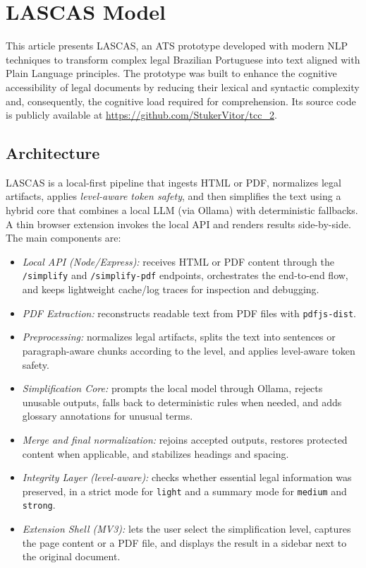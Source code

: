 \documentclass[english]{UNISINOSartigo} %
\begin{document}
\section{LASCAS Model}

This article presents LASCAS, an ATS prototype developed with modern NLP techniques to transform complex legal Brazilian Portuguese into text aligned with Plain Language principles. The prototype was built to enhance the cognitive accessibility of legal documents by reducing their lexical and syntactic complexity and, consequently, the cognitive load required for comprehension. Its source code is publicly available at \url{https://github.com/StukerVitor/tcc_2}.

\subsection{Architecture}

LASCAS is a local-first pipeline that ingests HTML or PDF, normalizes legal artifacts, applies \emph{level-aware token safety}, and then simplifies the text using a hybrid core that combines a local LLM (via Ollama) with deterministic fallbacks. A thin browser extension invokes the local API and renders results side-by-side. The main components are:

\begin{itemize}
\item \textit{Local API (Node/Express):} receives HTML or PDF content through the \texttt{/simplify} and \texttt{/simplify-pdf} endpoints, orchestrates the end-to-end flow, and keeps lightweight cache/log traces for inspection and debugging.
\item \textit{PDF Extraction:} reconstructs readable text from PDF files with \texttt{pdfjs-dist}.
\item \textit{Preprocessing:} normalizes legal artifacts, splits the text into sentences or paragraph-aware chunks according to the level, and applies level-aware token safety.
\item \textit{Simplification Core:} prompts the local model through Ollama, rejects unusable outputs, falls back to deterministic rules when needed, and adds glossary annotations for unusual terms.
\item \textit{Merge and final normalization:} rejoins accepted outputs, restores protected content when applicable, and stabilizes headings and spacing.
\item \textit{Integrity Layer (level-aware):} checks whether essential legal information was preserved, in a strict mode for \texttt{light} and a summary mode for \texttt{medium} and \texttt{strong}.
\item \textit{Extension Shell (MV3):} lets the user select the simplification level, captures the page content or a PDF file, and displays the result in a sidebar next to the original document.
\end{itemize}
\end{document}
